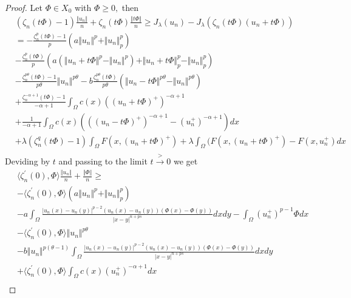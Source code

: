 \documentclass[10pt,twoside,reqno,centertags,draft]{amsart}
\begin{document}
\begin{proof}
Let $ \Phi \in X_0$ with $ \Phi \geq 0,$ then
\begin{equation*}
\begin{aligned}
&(\zeta_n(t\Phi) -1)\frac{\Vert u_n\Vert}{n} +\zeta_n(t\Phi)\frac{\Vert t\Phi\Vert}{n} \geq J_{\lambda}(u_n) -J_{\lambda}(\zeta_n(t\Phi)(u_n +t\Phi))\\
& =-\frac{\zeta^{p}_n(t\Phi) -1}{p}\left(a\Vert u_n\Vert^{p} +\Vert u_n\Vert^{p}_{p}\right)\\
& -\frac{\zeta^{p}_n(t\Phi)}{p}\left(a(\Vert u_n +t\Phi\Vert^{p} -\Vert u_n\Vert^{p}) + \Vert u_n +t\Phi\Vert^{p}_{p} -\Vert u_n\Vert^{p}_{p}\right)\\
& -\frac{\zeta^{p\theta}_n(t\Phi) -1}{p\theta}\Vert u_n\Vert^{p\theta} -b\frac{\zeta^{p\theta}_n(t\Phi)}{p\theta}\left( \Vert u_n -t\Phi\Vert^{p\theta} -\Vert u_n\Vert^{p\theta}\right)\\
& +\frac{\zeta^{-\alpha +1}_n(t\Phi) -1}{-\alpha +1}\int_{\Omega} c(x)((u_n +t\Phi)^+)^{-\alpha +1}\\
&+\frac{1}{-\alpha +1}\int_{\Omega} c(x) 
\left(((u_n -t\Phi)^+)^{-\alpha +1} -(u_n^+)^{-\alpha +1}\right)dx\\
& +\lambda (\zeta^{q}_n(t\Phi) -1)\int_{\Omega}F(x,(u_n +t\Phi)^+) +\lambda\int_{\Omega}(F(x,(u_n +t\Phi)^+) -F(x, u_n^+)dx\\
\end{aligned}
\end{equation*}
Deviding by $ t$ and passing to the limit $ t \xrightarrow{>} 0$ we get 
\begin{equation*}
\begin{aligned}
& \langle\zeta^{\prime}_n(0), \Phi\rangle\frac{\Vert u_n\Vert}{n} +\frac{\Vert\Phi\Vert}{n} \geq\\
& -\langle\zeta^{\prime}_n(0), \Phi\rangle\left(a\Vert u_n\Vert^{p} +\Vert u_n\Vert^{p}_{p}\right)\\
& -a\int_{\Omega}\frac{\vert u_n(x) -u_n(y)\vert^{p -2}(u_n(x) -u_n(y))(\Phi(x) -\Phi(y))}{\vert x -y\vert^{n +ps}}dxdy -\int_{\Omega}(u_n^+)^{p-1}\Phi dx\\
& -\langle\zeta^{\prime}_n(0), \Phi\rangle\Vert u_n\Vert^{p\theta}\\
& -b\Vert u_n\Vert^{p(\theta -1)}\int_{\Omega}\frac{\vert u_n(x) -u_n(y)\vert^{p -2}(u_n(x) -u_n(y))(\Phi(x) -\Phi(y))}{\vert x -y\vert^{n +ps}}dxdy\\
& +\langle\zeta^{\prime}_n(0), \Phi\rangle\int_{\Omega}c(x)(u_n^+)^{-\alpha +1}dx\\\

\end{aligned}
\end{equation*}
\end{proof}
\end{document}
